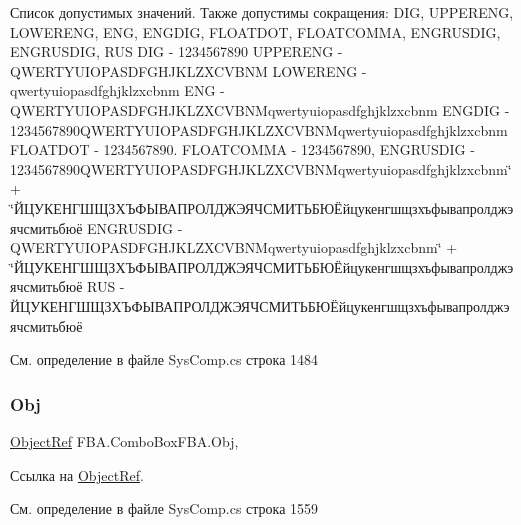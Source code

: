 Список допустимых значений. Также допустимы сокращения\+: D\+IG, U\+P\+P\+E\+R\+E\+NG, L\+O\+W\+E\+R\+E\+NG, E\+NG, E\+N\+G\+D\+IG, F\+L\+O\+A\+T\+D\+OT, F\+L\+O\+A\+T\+C\+O\+M\+MA, E\+N\+G\+R\+U\+S\+D\+IG, E\+N\+G\+R\+U\+S\+D\+IG, R\+US D\+IG -\/ 1234567890 U\+P\+P\+E\+R\+E\+NG -\/ Q\+W\+E\+R\+T\+Y\+U\+I\+O\+P\+A\+S\+D\+F\+G\+H\+J\+K\+L\+Z\+X\+C\+V\+B\+NM L\+O\+W\+E\+R\+E\+NG -\/ qwertyuiopasdfghjklzxcbnm E\+NG -\/ Q\+W\+E\+R\+T\+Y\+U\+I\+O\+P\+A\+S\+D\+F\+G\+H\+J\+K\+L\+Z\+X\+C\+V\+B\+N\+Mqwertyuiopasdfghjklzxcbnm E\+N\+G\+D\+IG -\/ 1234567890\+Q\+W\+E\+R\+T\+Y\+U\+I\+O\+P\+A\+S\+D\+F\+G\+H\+J\+K\+L\+Z\+X\+C\+V\+B\+N\+Mqwertyuiopasdfghjklzxcbnm F\+L\+O\+A\+T\+D\+OT -\/ 1234567890. F\+L\+O\+A\+T\+C\+O\+M\+MA -\/ 1234567890, E\+N\+G\+R\+U\+S\+D\+IG -\/ 1234567890\+Q\+W\+E\+R\+T\+Y\+U\+I\+O\+P\+A\+S\+D\+F\+G\+H\+J\+K\+L\+Z\+X\+C\+V\+B\+N\+Mqwertyuiopasdfghjklzxcbnm\char`\"{} + \char`\"{}ЙЦУКЕНГШЩЗХЪФЫВАПРОЛДЖЭЯЧСМИТЬБЮЁйцукенгшщзхъфывапролджэячсмитьбюё E\+N\+G\+R\+U\+S\+D\+IG -\/ Q\+W\+E\+R\+T\+Y\+U\+I\+O\+P\+A\+S\+D\+F\+G\+H\+J\+K\+L\+Z\+X\+C\+V\+B\+N\+Mqwertyuiopasdfghjklzxcbnm\char`\"{} + \char`\"{}ЙЦУКЕНГШЩЗХЪФЫВАПРОЛДЖЭЯЧСМИТЬБЮЁйцукенгшщзхъфывапролджэячсмитьбюё R\+US -\/ ЙЦУКЕНГШЩЗХЪФЫВАПРОЛДЖЭЯЧСМИТЬБЮЁйцукенгшщзхъфывапролджэячсмитьбюё 



См. определение в файле Sys\+Comp.\+cs строка 1484

\mbox{\label{class_f_b_a_1_1_combo_box_f_b_a_a4b8b35c54f082eb00921dfbe1a602eec}} 
\subsubsection{\texorpdfstring{Obj}{Obj}}
{\footnotesize\ttfamily \mbox{\hyperlink{class_f_b_a_1_1_object_ref}{Object\+Ref}} F\+B\+A.\+Combo\+Box\+F\+B\+A.\+Obj\hspace{0.3cm}{\ttfamily [get]}, {\ttfamily [set]}}



Ссылка на \mbox{\hyperlink{class_f_b_a_1_1_object_ref}{Object\+Ref}}. 



См. определение в файле Sys\+Comp.\+cs строка 1559

\mbox{\label{class_f_b_a_1_1_combo_box_f_b_a_a5a6687cb43572db12ca96590b4a7c0ce}} 
